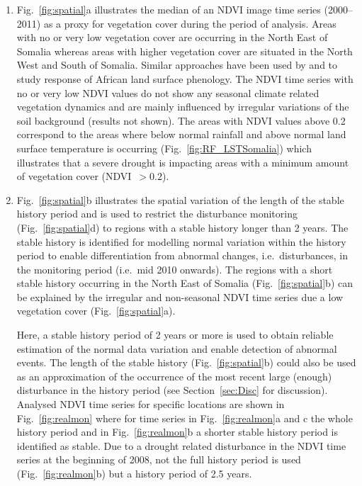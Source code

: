 \documentclass[authoryear,preprint,review,10pt]{elsarticle}
\begin{document}
\begin{enumerate}[(1)]

\item Fig.~\ref{fig:spatial}a illustrates the median of an NDVI image time series (2000--2011) as a proxy for vegetation cover during the period of analysis. Areas with no or very low vegetation cover are occurring in the North East of Somalia whereas areas with higher vegetation cover are situated in the North West and South of Somalia. Similar approaches have been used by \citet{Brown:2010fq} and \citet{Vrieling:2011da} to study response of African land surface phenology. The NDVI time series with no or very low NDVI values do not show any seasonal climate related vegetation dynamics and are mainly influenced by irregular variations of the soil background (results not shown). The areas with NDVI values above 0.2 correspond to the areas where below normal rainfall and above normal land surface temperature is occurring (Fig.~\ref{fig:RF_LSTSomalia}) which illustrates that a severe drought is impacting areas with a minimum amount of vegetation cover (NDVI~$> 0.2$). 

\item Fig.~\ref{fig:spatial}b illustrates the spatial variation of the length of the stable history period and is used to restrict the disturbance monitoring (Fig.~\ref{fig:spatial}d) to regions with a stable history longer than 2 years. The stable history is identified for modelling normal variation within the history period to enable differentiation from abnormal changes, i.e.\ disturbances, in the monitoring period (i.e.\ mid 2010 onwards). The regions with a short stable history occurring in the North East of Somalia (Fig.~\ref{fig:spatial}b) can be explained by the irregular and non-seasonal NDVI time series due a low vegetation cover (Fig.~\ref{fig:spatial}a).  

Here, a stable history period of 2 years or more is used to obtain reliable estimation of the normal data variation and enable detection of abnormal events. The length of the stable history (Fig.~\ref{fig:spatial}b) could also be used as an approximation of the occurrence of the most recent large (enough) disturbance in the history period (see Section~\ref{sec:Disc} for discussion). Analysed NDVI time series for specific locations are shown in Fig.~\ref{fig:realmon} where for time series in Fig.~\ref{fig:realmon}a and c the whole history period and in Fig.~\ref{fig:realmon}b a shorter stable history period is identified as stable. Due to a drought related disturbance in the NDVI time series at the beginning of 2008, not the full history period is used (Fig.~\ref{fig:realmon}b) but a history period of 2.5 years. 

\end{enumerate}
\end{document}
